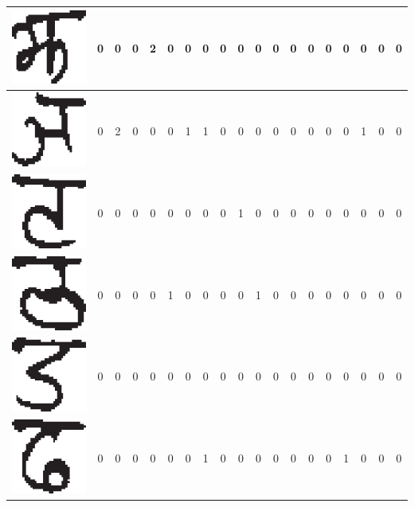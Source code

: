 \begin{table}[h]
\begin{tabular}{|c|c|c|c|c|c|c|c|c|c|c|c|c|c|c|c|c|c|c|}
\hline
\includegraphics[scale=0.25]{figures/datasets/nhcr/consonants/9jha} & 0 & 0 & 0 & 2 & 0 & 0 & 0 & 0 & 0 & 0 & 0 & 0 & 0 & 0 & 0 & 0 & 0 & 0\tabularnewline
\hline
\includegraphics[scale=0.25]{figures/datasets/nhcr/consonants/10yna} & 0 & 2 & 0 & 0 & 0 & 1 & 1 & 0 & 0 & 0 & 0 & 0 & 0 & 0 & 0 & 1 & 0 & 0\tabularnewline
\hline
\includegraphics[scale=0.25]{figures/datasets/nhcr/consonants/11ta} & 0 & 0 & 0 & 0 & 0 & 0 & 0 & 0 & 1 & 0 & 0 & 0 & 0 & 0 & 0 & 0 & 0 & 0\tabularnewline
\hline
\includegraphics[scale=0.25]{figures/datasets/nhcr/consonants/12tha} & 0 & 0 & 0 & 0 & 1 & 0 & 0 & 0 & 0 & 1 & 0 & 0 & 0 & 0 & 0 & 0 & 0 & 0\tabularnewline
\hline
\includegraphics[scale=0.25]{figures/datasets/nhcr/consonants/13da} & 0 & 0 & 0 & 0 & 0 & 0 & 0 & 0 & 0 & 0 & 0 & 0 & 0 & 0 & 0 & 0 & 0 & 0\tabularnewline
\hline
\includegraphics[scale=0.25]{figures/datasets/nhcr/consonants/14dha} & 0 & 0 & 0 & 0 & 0 & 0 & 1 & 0 & 0 & 0 & 0 & 0 & 0 & 0 & 1 & 0 & 0 & 0\tabularnewline

\end{tabular}
\end{table}
